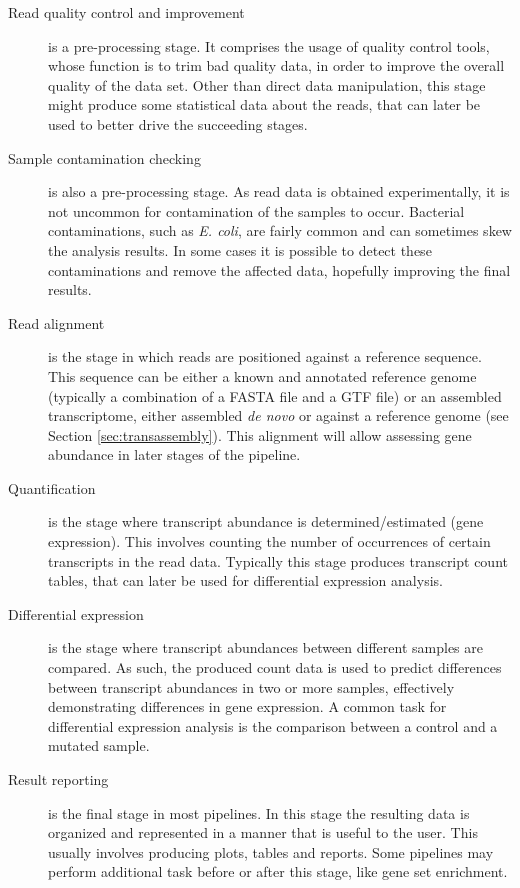 \begin{description}

  \item[Read quality control and improvement]
  is a pre-processing stage. It comprises the usage of quality control tools,
  whose function is to trim bad quality data, in order to improve the overall
  quality of the data set. Other than direct data manipulation, this stage might
  produce some statistical data about the reads, that can later be used to
  better drive the succeeding stages.

  \item[Sample contamination checking]
  is also a pre-processing stage. As read data is obtained experimentally, it is
  not uncommon for contamination of the samples to occur. Bacterial
  contaminations, such as \emph{E. coli}, are fairly common and can sometimes
  skew the analysis results. In some cases it is possible to detect these
  contaminations and remove the affected data, hopefully improving the final
  results.

  \item[Read alignment]
  is the stage in which reads are positioned against a reference sequence. This
  sequence can be either a known and annotated reference genome (typically a
  combination of a FASTA file and a GTF file) or an assembled transcriptome,
  either assembled \emph{de novo} or against a reference genome (see Section
  \ref{sec:transassembly}). This alignment will allow assessing gene abundance
  in later stages of the pipeline.

  \item[Quantification]
  is the stage where transcript abundance is determined/estimated (gene
  expression). This involves counting the number of occurrences of certain
  transcripts in the read data. Typically this stage produces transcript count
  tables, that can later be used for differential expression analysis.

  \item[Differential expression]
  is the stage where transcript abundances between different samples are
  compared. As such, the produced count data is used to predict differences
  between transcript abundances in two or more samples, effectively
  demonstrating differences in gene expression. A common task for differential
  expression analysis is the comparison between a control and a mutated sample.

  \item[Result reporting]
  is the final stage in most pipelines. In this stage the resulting data is
  organized and represented in a manner that is useful to the user. This usually
  involves producing plots, tables and reports. Some pipelines may perform
  additional task before or after this stage, like gene set enrichment.

\end{description}

